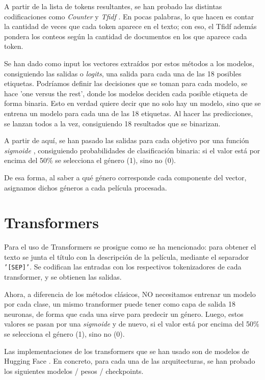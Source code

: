 \documentclass[11pt,spanish,listoffigures,listoftables]{tfgetsinf}
\begin{document}
A partir de la lista de tokens resultantes, se han probado las distintas codificaciones como \textit{Counter} \cite{countvectorizer-sklearn-2025} y \textit{Tfidf} \cite{tfidfvectorizer-sklearn-2025}. En pocas palabras, lo que hacen es contar la cantidad de veces que cada token aparece en el texto; con eso, el Tfidf además pondera los conteos según la cantidad de documentos en los que aparece cada token. 

Se han dado como input los vectores extraídos por estos métodos a los modelos, consiguiendo las salidas o \textit{logits}, una salida para cada una de las 18 posibles etiquetas. Podríamos definir las decisiones que se toman para cada modelo, se hace 'one versus the rest', donde los modelos deciden cada posible etiqueta de forma binaria. Esto en verdad quiere decir que no solo hay un modelo, sino que se entrena un modelo para cada una de las 18 etiquetas. Al hacer las predicciones, se lanzan todos a la vez, consiguiendo 18 resultados que se binarizan.

A partir de aquí, se han pasado las salidas para cada objetivo por una función \textit{sigmoide} \cite{sigmoid-wikipedia-contributors-2025}, consiguiendo probabilidades de clasificación binaria: si el valor está por encima del 50\% se selecciona el género (1), sino no (0).

De esa forma, al saber a qué género corresponde cada componente del vector, asignamos dichos géneros a cada película procesada.

\section{Transformers}
Para el uso de Transformers se prosigue como se ha mencionado: para obtener el texto se junta el título con la descripción de la película, mediante el separador \texttt{'[SEP]'}. Se codifican las entradas con los respectivos tokenizadores de cada transformer, y se obtienen las salidas.

Ahora, a diferencia de los métodos clásicos, NO necesitamos entrenar un modelo por cada clase, un mismo transformer puede tener como capa de salida 18 neuronas, de forma que cada una sirve para predecir un género. Luego, estos valores se pasan por una \textit{sigmoide} y de nuevo, si el valor está por encima del 50\% se selecciona el género (1), sino no (0).

Las implementaciones de los transformers que se han usado son de modelos de Hugging Face \cite{hugginface}. En concreto, para cada una de las arquitecturas, se han probado los siguientes modelos / pesos / checkpoints.
\end{document}
